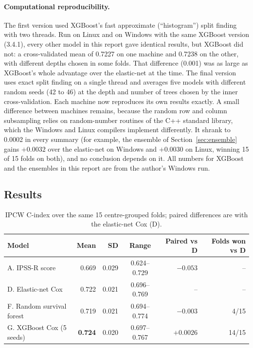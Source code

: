 \documentclass[11pt,a4paper]{article}
\begin{document}
\paragraph{Computational reproducibility.} The first version used XGBoost's fast
approximate (``histogram'') split finding with two threads. Run on Linux and on Windows
with the same XGBoost version (3.4.1), every other model in this report gave identical
results, but XGBoost did not: a cross-validated mean of 0.7227 on one machine and 0.7238 on
the other, with different depths chosen in some folds. That difference (0.001) was as large
as XGBoost's whole advantage over the elastic-net at the time. The final version uses exact
split finding on a single thread and averages five models with different random seeds
(42 to 46) at the depth and number of trees chosen by the inner cross-validation. Each
machine now reproduces its own results exactly. A small difference between machines
remains, because the random row and column subsampling relies on random-number routines
of the C++ standard library, which the Windows and Linux compilers implement differently.
It shrank to 0.0002 in every summary (for example, the ensemble of Section~\ref{sec:ensemble}
gains $+0.0032$ over the elastic-net on Windows and $+0.0030$ on Linux, winning 15 of 15
folds on both), and no conclusion depends on it. All numbers for XGBoost and the
ensembles in this report are from the author's Windows run.

\subsection{Results}

\begin{table}[H]
\centering
\caption{IPCW C-index over the same 15 centre-grouped folds; paired differences are with
the elastic-net Cox (D).}
\label{tab:treecv}
\begin{tabular}{lrrcrr}
\toprule
Model & Mean & SD & Range & Paired vs D & Folds won vs D \\
\midrule
A. IPSS-R score              & 0.669 & 0.029 & 0.624--0.729 & $-0.053$  & --    \\
D. Elastic-net Cox           & 0.722 & 0.021 & 0.696--0.769 & --        & --    \\
F. Random survival forest    & 0.719 & 0.021 & 0.694--0.774 & $-0.003$  & 4/15  \\
G. XGBoost Cox (5 seeds)     & \textbf{0.724} & 0.020 & 0.697--0.767 & $+0.0026$ & 14/15 \\
\bottomrule
\end{tabular}
\end{table}
\end{document}
